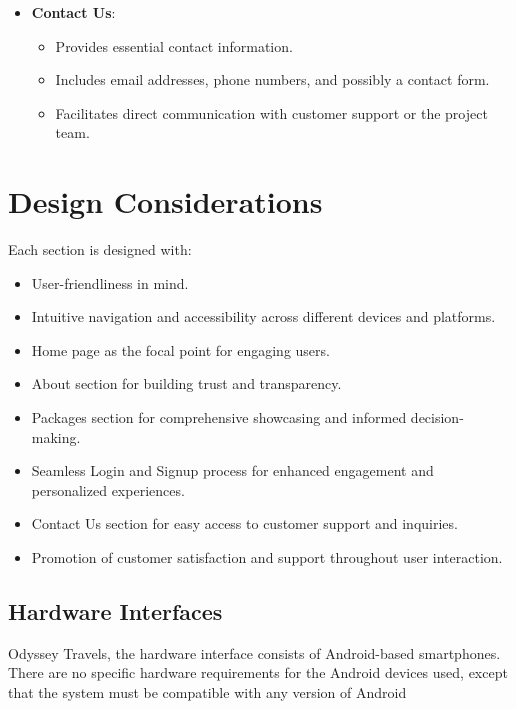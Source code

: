 \documentclass{scrreprt}
\begin{document}
\begin{itemize}
    \item \textbf{Contact Us}:
    \begin{itemize}
        \item Provides essential contact information.
        \item Includes email addresses, phone numbers, and possibly a contact form.
        \item Facilitates direct communication with customer support or the project team.
    \end{itemize}
\end{itemize}

\section*{Design Considerations}
Each section is designed with:
\begin{itemize}
    \item User-friendliness in mind.
    \item Intuitive navigation and accessibility across different devices and platforms.
    \item Home page as the focal point for engaging users.
    \item About section for building trust and transparency.
    \item Packages section for comprehensive showcasing and informed decision-making.
    \item Seamless Login and Signup process for enhanced engagement and personalized experiences.
    \item Contact Us section for easy access to customer support and inquiries.
    \item Promotion of customer satisfaction and support throughout user interaction.
\end{itemize}

\subsection{Hardware Interfaces}
Odyssey Travels, the hardware interface consists of Android-based smartphones. There are no specific hardware requirements for the Android devices used, except that the system must be compatible with any version of Android
\end{document}
